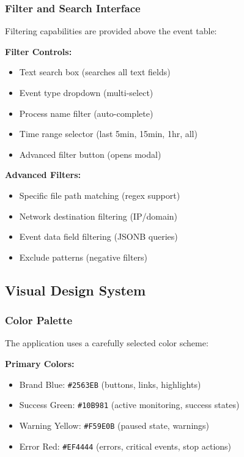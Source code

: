 \subsubsection{Filter and Search Interface}

Filtering capabilities are provided above the event table:

\textbf{Filter Controls:}
\begin{itemize}
    \item Text search box (searches all text fields)
    \item Event type dropdown (multi-select)
    \item Process name filter (auto-complete)
    \item Time range selector (last 5min, 15min, 1hr, all)
    \item Advanced filter button (opens modal)
\end{itemize}

\textbf{Advanced Filters:}
\begin{itemize}
    \item Specific file path matching (regex support)
    \item Network destination filtering (IP/domain)
    \item Event data field filtering (JSONB queries)
    \item Exclude patterns (negative filters)
\end{itemize}

\subsection{Visual Design System}

\subsubsection{Color Palette}

The application uses a carefully selected color scheme:

\textbf{Primary Colors:}
\begin{itemize}
    \item Brand Blue: \texttt{\#2563EB} (buttons, links, highlights)
    \item Success Green: \texttt{\#10B981} (active monitoring, success states)
    \item Warning Yellow: \texttt{\#F59E0B} (paused state, warnings)
    \item Error Red: \texttt{\#EF4444} (errors, critical events, stop actions)
\end{itemize}

